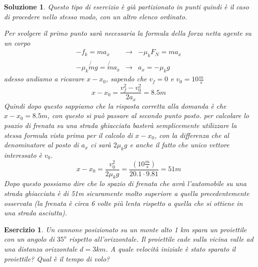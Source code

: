 \documentclass{article}
\newtheorem{es}{Esercizio}[section]
\newtheorem{sol}{Soluzione}[section]
\begin{document}
\begin{sol}
  Questo tipo di esercizio è già partizionato in punti quindi è il caso di procedere nello stesso modo, con un altro elenco ordinato.
  \begin{tasks}
    \task Per svolgere il primo punto sarà necessaria la formula della forza netta agente su un corpo
    \begin{equation*}
      \begin{matrix}
        -f_k=ma_x &\to& -\mu_kF_N=ma_x\\
        -\mu_k\not{m}g=\not{m}a_x&\to& a_x=-\mu_kg
      \end{matrix}
    \end{equation*}
    adesso andiamo a ricavare $x-x_0$, sapendo che $v_f=0$ e $v_0=10\frac{m}{s}$
    \begin{equation*}
      x-x_0=\frac{v_f^2-v_0^2}{2a_x}=8.5m
    \end{equation*}
    Quindi dopo questo sappiamo che la risposta corretta alla domanda è che $x-x_0=8.5m$, con questo si può passare al secondo punto posto.
    \task per calcolare lo psazio di frenata su una strada ghiacciata basterà semplicemente utilizzare la stessa formula vista prima per il calcolo di $x-x_0$, con la differenza che al denominatore al posto di $a_x$ ci sarà $2\mu_kg$ e anche il fatto che unico vettore interessato è $v_0$.
    \begin{equation*}
      x-x_0=\frac{v_0^2}{2\mu_kg}=\frac{\left(10\frac{m}{s}\right)}{20.1\cdot 9.81}=51m
    \end{equation*}
    Dopo questo possiamo dire che lo spazio di frenata che avrà l'automobile su una strada ghiacciata è di 51m sicuramente molto superiore a quella precedentemente osservata (la frenata è circa 6 volte più lenta rispetto a quella che si ottiene in una strada asciutta).
  \end{tasks}
\end{sol}
\begin{es}
  Un cannone posizionato su un monte alto 1 km spara un proiettile con un angolo di $35^o$ rispetto all’orizzontale. Il proiettile cade sulla vicina valle ad una distanza orizzontale $d= 3 km$. A quale velocità iniziale è stato sparato il proiettile? Qual è il tempo di volo?
\end{es}
\end{document}
